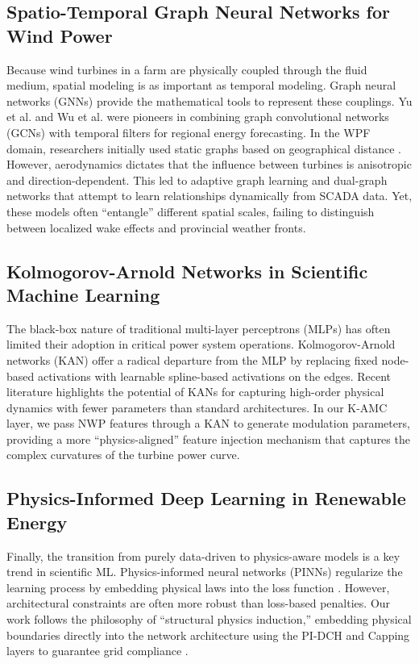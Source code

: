\subsection{Spatio-Temporal Graph Neural Networks for Wind Power}
\label{sec:related_spatial}
Because wind turbines in a farm are physically coupled through the fluid medium, spatial modeling is as important as temporal modeling. Graph neural networks (GNNs) \cite{kipf2017semi, velickovic2018graph} provide the mathematical tools to represent these couplings. Yu et al. \cite{yu2017spatio} and Wu et al. \cite{wu2019graph} were pioneers in combining graph convolutional networks (GCNs) with temporal filters for regional energy forecasting. In the WPF domain, researchers initially used static graphs based on geographical distance \cite{khodayar2019spatio}. However, aerodynamics dictates that the influence between turbines is anisotropic and direction-dependent. This led to adaptive graph learning \cite{ren2023data, bentsen2022spatio} and dual-graph networks \cite{li2024sdg} that attempt to learn relationships dynamically from SCADA data. Yet, these models often ``entangle'' different spatial scales, failing to distinguish between localized wake effects and provincial weather fronts.

\subsection{Kolmogorov-Arnold Networks in Scientific Machine Learning}
\label{sec:related_kan}
The black-box nature of traditional multi-layer perceptrons (MLPs) has often limited their adoption in critical power system operations. Kolmogorov-Arnold networks (KAN) \cite{liu2024kan} offer a radical departure from the MLP by replacing fixed node-based activations with learnable spline-based activations on the edges. Recent literature \cite{yamak2025review, han2024kan4tsf, vaca2024kan, xu2024kolmogorov} highlights the potential of KANs for capturing high-order physical dynamics with fewer parameters than standard architectures. In our K-AMC layer, we pass NWP features through a KAN to generate modulation parameters, providing a more ``physics-aligned'' feature injection mechanism that captures the complex curvatures of the turbine power curve.

\subsection{Physics-Informed Deep Learning in Renewable Energy}
\label{sec:related_physics}
Finally, the transition from purely data-driven to physics-aware models is a key trend in scientific ML. Physics-informed neural networks (PINNs) regularize the learning process by embedding physical laws into the loss function \cite{welsh2025physics, potosnak2024severe}. However, architectural constraints are often more robust than loss-based penalties. Our work follows the philosophy of ``structural physics induction,'' embedding physical boundaries directly into the network architecture using the PI-DCH and Capping layers to guarantee grid compliance \cite{Shi2023UltraShort}.
